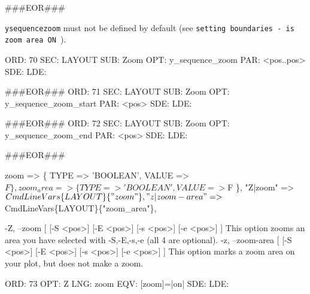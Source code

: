 \documentclass[11pt]{article}
\def\nwendcode{\endtrivlist \endgroup} %
\let\nwdocspar=\par                    %
\begin{document}
###EOR###
\nwendcode{}\nwdocspar

{\tt{}y{}sequence{}zoom} must not be defined by default (see {\tt{}\LA{}setting boundaries - is zoom area ON~{\nwtagstyle{}}\RA{}}).

\nwenddocs{}\plusendmoddef
ORD: 70
SEC: LAYOUT
SUB: Zoom
OPT: y_sequence_zoom
PAR: <pos..pos>
SDE: 
LDE: 

###EOR###
ORD: 71
SEC: LAYOUT
SUB: Zoom
OPT: y_sequence_zoom_start
PAR: <pos>
SDE: 
LDE: 

###EOR###
ORD: 72
SEC: LAYOUT
SUB: Zoom
OPT: y_sequence_zoom_end
PAR: <pos>
SDE: 
LDE: 

###EOR###
\nwendcode{}\nwdocspar

\nwenddocs{}\plusendmoddef
zoom                       => \{ TYPE => 'BOOLEAN', VALUE => $F           \},
zoom_area                  => \{ TYPE => 'BOOLEAN', VALUE => $F           \},
\eatline
{}\nwendcode{}\plusendmoddef
"Z|zoom"                 => \\$CmdLineVars\{LAYOUT\}\{"zoom"\},
"z|zoom-area"            => \\$CmdLineVars\{LAYOUT\}\{"zoom_area"\},
\nwendcode{}\nwdocspar
\nwenddocs{}\plusendmoddef
-Z, --zoom [ [-S <pos>] [-E <pos>] [-s <pos>] [-e <pos>] ]
               This option zooms an area you have selected
               with -S,-E,-s,-e (all 4 are optional).
-z, --zoom-area [ [-S <pos>] [-E <pos>] [-s <pos>] [-e <pos>] ]
               This option marks a zoom area on your plot,
               but does not make a zoom.
\nwendcode{}\nwdocspar
\nwenddocs{}\plusendmoddef
ORD: 73
OPT: Z
LNG: zoom
EQV: [zoom]=|on|
SDE: 
LDE: 
\end{document}
